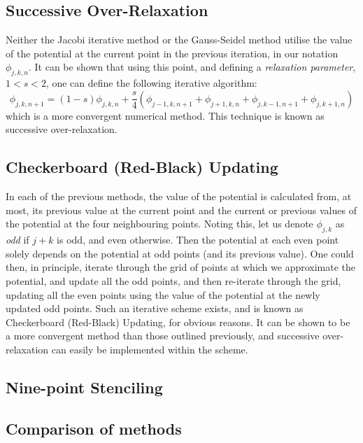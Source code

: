 \documentclass[12pt, a4paper]{article}
\newcommand{\be}{\begin{equation}}
\newcommand{\ee}{\end{equation}}
\begin{document}
\subsection{Successive Over-Relaxation}

Neither the Jacobi iterative method or the Gauss-Seidel method utilise the value
of the potential at the current point in the previous iteration, in our notation
$\phi_{j,k,n}$. It can be shown that using this point, and defining a
\emph{relaxation parameter}, $1<s<2$, one can define the following iterative algorithm:
%
\be
\phi_{j,k,n+1}= (1-s)\phi_{j,k,n}+\frac{s}{4}(\phi_{j-1,k,n+1}+\phi_{j+1,k,n}+\phi_{j,k-1,n+1}+\phi_{j,k+1,n})
\ee
%
which is a more convergent numerical method. This technique is known as successive
over-relaxation.


\subsection{Checkerboard (Red-Black) Updating}

In each of the previous methods, the value of the potential is calculated from, at most,
its previous value at the current point and the current or previous values of the
potential at the four neighbouring points. Noting this, let us denote $\phi_{j,k}$ as
\emph{odd} if $j+k$ is odd, and even otherwise. Then the potential at each even point
solely depends on the potential at odd points (and its previous value). One could then,
in principle, iterate through the grid of points at which we approximate the potential,
and update all the odd points, and then re-iterate through the grid, updating all the
even points using the value of the potential at the newly updated odd points. Such an
iterative scheme exists, and is known as Checkerboard (Red-Black) Updating, for obvious
reasons. It can be shown to be a more convergent method than those outlined previously,
and successive over-relaxation can easily be implemented within the scheme.

%

\subsection{Nine-point Stenciling}
%

\subsection{Comparison of methods}
\end{document}

